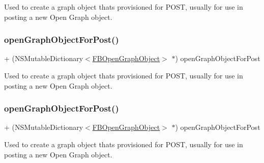 Used to create a graph object that\textquotesingle{}s provisioned for P\+O\+ST, usually for use in posting a new Open Graph object. \mbox{\label{interfaceFBGraphObject_a79fab85a97be10dc0d5bf6febcc848f4}} 
\subsubsection{\texorpdfstring{open\+Graph\+Object\+For\+Post()}{openGraphObjectForPost()}\hspace{0.1cm}{\footnotesize\ttfamily [3/5]}}
{\footnotesize\ttfamily + (N\+S\+Mutable\+Dictionary$<$\hyperlink{protocolFBOpenGraphObject-p}{F\+B\+Open\+Graph\+Object}$>$ $\ast$) open\+Graph\+Object\+For\+Post \begin{DoxyParamCaption}{ }\end{DoxyParamCaption}}

Used to create a graph object that\textquotesingle{}s provisioned for P\+O\+ST, usually for use in posting a new Open Graph object. \mbox{\label{interfaceFBGraphObject_a79fab85a97be10dc0d5bf6febcc848f4}} 
\subsubsection{\texorpdfstring{open\+Graph\+Object\+For\+Post()}{openGraphObjectForPost()}\hspace{0.1cm}{\footnotesize\ttfamily [4/5]}}
{\footnotesize\ttfamily + (N\+S\+Mutable\+Dictionary$<$\hyperlink{protocolFBOpenGraphObject-p}{F\+B\+Open\+Graph\+Object}$>$ $\ast$) open\+Graph\+Object\+For\+Post \begin{DoxyParamCaption}{ }\end{DoxyParamCaption}}

Used to create a graph object that\textquotesingle{}s provisioned for P\+O\+ST, usually for use in posting a new Open Graph object. \mbox{\label{interfaceFBGraphObject_a79fab85a97be10dc0d5bf6febcc848f4}} 

